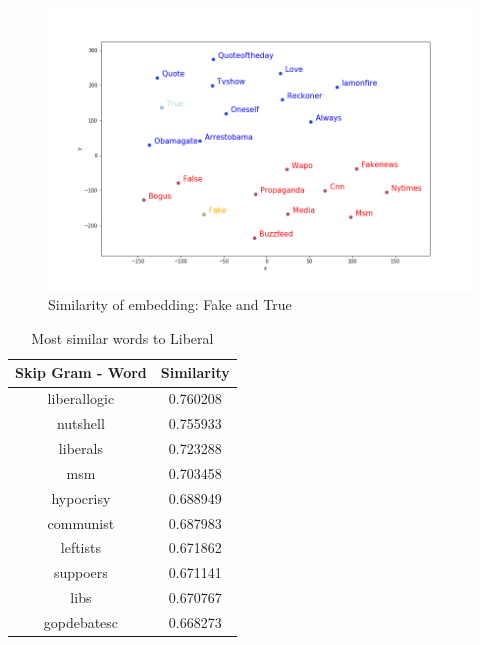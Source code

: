 \documentclass[12pt, authoryear]{elsarticle}
\begin{document}
\begin{figure}[H]
\includegraphics[width=6in]{embedding_fake_true}
\centering
\caption{Similarity of embedding: Fake and True}
\label{embedding:4}
\end{figure}

\begin{center}
\begin{table}[H]
\begin{tabular}{ c c } 
Skip Gram - Word   &  Similarity \\
 \hline
liberallogic   &  0.760208 \\
nutshell   &  0.755933 \\
liberals   &  0.723288\\
msm   &  0.703458\\
hypocrisy  &   0.688949\\
communist  &   0.687983\\
leftists  &   0.671862\\
suppoers    & 0.671141\\
libs   &  0.670767\\
gopdebatesc   &  0.668273\\
 \hline
\end{tabular}
\caption{Most similar words to Liberal}
\label{table:7}
\end{table}
\end{center}
\end{document}
